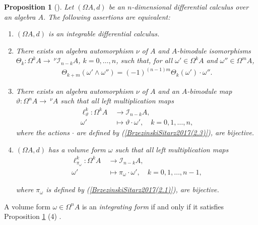 \documentclass{amsart}
\newtheorem{proposition}[theorem]{Proposition}
\theoremstyle{definition}
\theoremstyle{remark}
\numberwithin{equation}{section}
\begin{document}
\begin{proposition}[{\cite[Theorem 2.2]{BrzezinskiSitarz2017}}]\label{integrableequiva} 
Let $(\Omega A, d)$ be an $n$-dimensional differential calculus over an algebra $A$. The following assertions are equivalent:
\begin{enumerate}
    \item [\rm (1)] $(\Omega A, d)$ is an integrable differential calculus.
    
    \item [\rm (2)] There exists an algebra automorphism $\nu$ of $A$ and $A$-bimodule isomorphisms $\Theta_k : \Omega^k A \rightarrow \ ^{\nu}\mathcal{I}_{n-k}A$, $k =0, \ldots, n$, such that, for all $\omega'\in \Omega^k A$ and $\omega''\in \Omega^mA$,
    \begin{align*}
        \Theta_{k+m}(\omega'\wedge\omega'')=(-1)^{(n-1)m}\Theta_k(\omega')\cdot\omega''.
    \end{align*}
    
    \item [\rm (3)] There exists an algebra automorphism $\nu$ of $A$ and an $A$-bimodule map $\vartheta:\Omega^nA\rightarrow\ ^{\nu}A$ such that all left multiplication maps
    \begin{align*}
    \ell_{\vartheta}^{k}:\Omega^k A &\ \rightarrow \mathcal{I}_{n-k}A, \\
    \omega' &\ \mapsto \vartheta\cdot\omega', \quad k = 0, 1, \dotsc, n,
    \end{align*}
    where the actions $\cdot$ are defined by {\rm (}\ref{BrzezinskiSitarz2017(2.3)}{\rm )}, are bijective.
    
    \item [\rm (4)] $(\Omega A, d)$ has a volume form $\omega$ such that all left multiplication maps
    \begin{align*}
        \ell_{\pi_{\omega}}^{k}:\Omega^k A &\ \rightarrow \mathcal{I}_{n-k}A, \\
        \omega' &\ \mapsto \pi_{\omega} \cdot \omega', \quad k=0,1, \dotsc, n-1,
    \end{align*}
    
    where $\pi_{\omega}$ is defined by {\rm (}\ref{BrzezinskiSitarz2017(2.1)}{\rm )}, are bijective.
\end{enumerate}
\end{proposition}

A volume form $\omega\in \Omega^nA$ is an {\em integrating form} if and only if it satisfies Proposition \ref{integrableequiva} (4) \cite[Remark 2.3]{BrzezinskiSitarz2017}.
\end{document}
